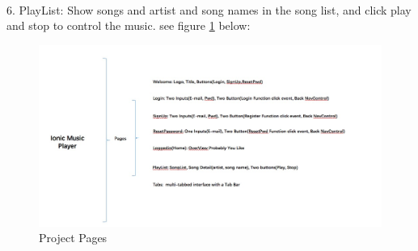 \\ 6. PlayList: Show songs and artist and song names in the song list, and click play and stop to control the music. see figure \ref{fig:6.10 cubed graph} below:
\begin{figure}[h]
	\centering
	\includegraphics[scale=0.4]{img/MainPage.png}
	\caption{Project Pages}
	\label{fig:6.10 cubed graph}
\end{figure}
